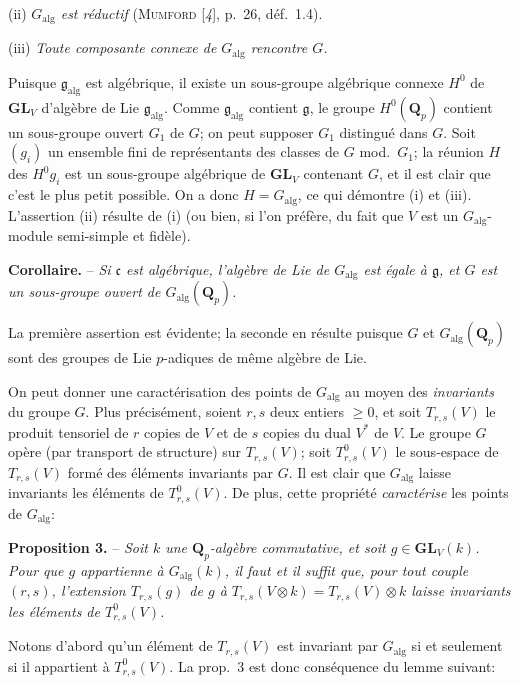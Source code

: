 (ii) \textit{$G_{\mathrm{alg}}$ est réductif} (\textsc{Mumford} [\textit{4}], p.~26, déf.~1.4).

(iii) \textit{Toute composante connexe de $G_{\mathrm{alg}}$ rencontre $G$.}

Puisque $\mathfrak{g}_{\mathrm{alg}}$ est algébrique, il existe un sous-groupe algébrique connexe $H^0$ de $\mathbf{GL}_V$ d’algèbre de Lie $\mathfrak{g}_{\mathrm{alg}}$. Comme $\mathfrak{g}_{\mathrm{alg}}$ contient $\mathfrak{g}$, le groupe $H^0(\mathbf{Q}_p)$ contient un sous-groupe ouvert $G_1$ de $G$; on peut supposer $G_1$ distingué dans $G$. Soit $(g_i)$ un ensemble fini de représentants des classes de $G$ mod.~$G_1$; la réunion $H$ des $H^0g_i$ est un sous-groupe algébrique de $\mathbf{GL}_V$ contenant $G$, et il est clair que c’est le plus petit possible. On a donc $H=G_{\mathrm{alg}}$, ce qui démontre (i) et (iii). L’assertion (ii) résulte de (i) (ou bien, si l’on préfère, du fait que $V$ est un $G_{\mathrm{alg}}$-module semi-simple et fidèle).

\textbf{Corollaire.} -- \textit{Si $\mathfrak{c}$ est algébrique, l’algèbre de Lie de $G_{\mathrm{alg}}$ est égale à $\mathfrak{g}$, et $G$ est un sous-groupe ouvert de $G_{\mathrm{alg}}(\mathbf{Q}_p)$.}

La première assertion est évidente; la seconde en résulte puisque $G$ et $G_{\mathrm{alg}}(\mathbf{Q}_p)$ sont des groupes de Lie $p$-adiques de même algèbre de Lie.

On peut donner une caractérisation des points de $G_{\mathrm{alg}}$ au moyen des \textit{invariants} du groupe $G$. Plus précisément, soient $r,s$ deux entiers $\geqslant 0$, et soit $T_{r,s}(V)$ le produit tensoriel de $r$ copies de $V$ et de $s$ copies du dual $V^*$ de $V$. Le groupe $G$ opère (par transport de structure) sur $T_{r,s}(V)$; soit $T^0_{r,s}(V)$ le sous-espace de $T_{r,s}(V)$ formé des éléments invariants par $G$. Il est clair que $G_{\mathrm{alg}}$ laisse invariants les éléments de $T^0_{r,s}(V)$. De plus, cette propriété \textit{caractérise} les points de $G_{\mathrm{alg}}$:

\textbf{Proposition 3.} -- \textit{Soit $k$ une $\mathbf{Q}_p$-algèbre commutative, et soit $g\in\mathbf{GL}_V(k)$. Pour que $g$ appartienne à $G_{\mathrm{alg}}(k)$, il faut et il suffit que, pour tout couple $(r,s)$, l’extension $T_{r,s}(g)$ de $g$ à $T_{r,s}(V\otimes k)=T_{r,s}(V)\otimes k$ laisse invariants les éléments de $T^0_{r,s}(V)$.}

Notons d’abord qu’un élément de $T_{r,s}(V)$ est invariant par $G_{\mathrm{alg}}$ si et seulement si il appartient à $T^0_{r,s}(V)$. La prop.~3 est donc conséquence du lemme suivant:


